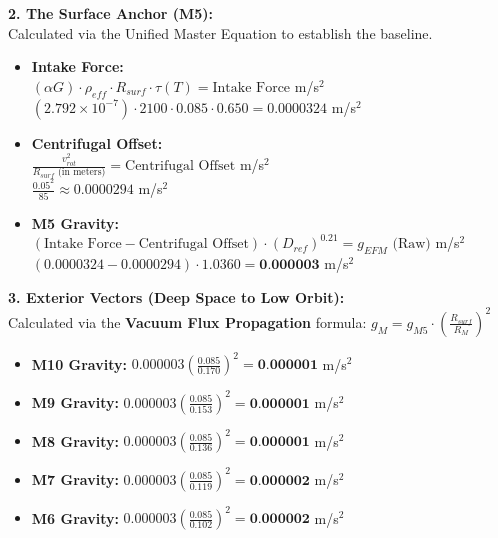 \documentclass[11pt, a4paper]{article}
\begin{document}
  \vspace{1.0em}
  \noindent \textbf{2. The Surface Anchor (M5):} \\
  \hspace*{1em} Calculated via the Unified Master Equation to establish the baseline.
  \begin{itemize}
    \item \textbf{Intake Force:} \\[0.5em]
    \hspace*{2em} $(\alpha G) \cdot \rho_{eff} \cdot R_{surf} \cdot \tau(T) = \text{Intake Force}$ m/s$^2$ \\[1em]
    \hspace*{2em} $(2.792 \times 10^{-7}) \cdot 2100 \cdot 0.085 \cdot 0.650 = 0.0000324$ m/s$^2$
    
    \item \textbf{Centrifugal Offset:} \\[0.5em]
    \hspace*{2em} $\frac{v_{rot}^2}{R_{surf} \text{ (in meters)}} = \text{Centrifugal Offset}$ m/s$^2$ \\[1em]
    \hspace*{2em} $\frac{0.05^2}{85} \approx 0.0000294$ m/s$^2$
    
    \item \textbf{M5 Gravity:} \\[0.5em]
    \hspace*{2em} $(\text{Intake Force} - \text{Centrifugal Offset}) \cdot (D_{ref})^{0.21} = g_{EFM} \text{ (Raw)}$ m/s$^2$ \\[1em]
    \hspace*{2em} $(0.0000324 - 0.0000294) \cdot 1.0360 = \textbf{0.000003}$ m/s$^2$
  \end{itemize}

  \clearpage
  \noindent \textbf{3. Exterior Vectors (Deep Space to Low Orbit):} \\
  \hspace*{1em} Calculated via the \textbf{Vacuum Flux Propagation} formula: $g_M = g_{M5} \cdot \left( \frac{R_{surf}}{R_M} \right)^2$
  \begin{itemize}
    \item \textbf{M10 Gravity:} $0.000003 \left( \frac{0.085}{0.170} \right)^2 = \textbf{0.000001}$ m/s$^2$
    \item \textbf{M9 Gravity:} $0.000003 \left( \frac{0.085}{0.153} \right)^2 = \textbf{0.000001}$ m/s$^2$
    \item \textbf{M8 Gravity:} $0.000003 \left( \frac{0.085}{0.136} \right)^2 = \textbf{0.000001}$ m/s$^2$
    \item \textbf{M7 Gravity:} $0.000003 \left( \frac{0.085}{0.119} \right)^2 = \textbf{0.000002}$ m/s$^2$
    \item \textbf{M6 Gravity:} $0.000003 \left( \frac{0.085}{0.102} \right)^2 = \textbf{0.000002}$ m/s$^2$
  \end{itemize}
\end{document}
